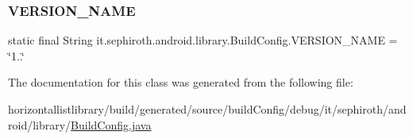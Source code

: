 \subsubsection{\texorpdfstring{V\+E\+R\+S\+I\+O\+N\+\_\+\+N\+A\+ME}{VERSION\_NAME}}
{\footnotesize\ttfamily static final String it.\+sephiroth.\+android.\+library.\+Build\+Config.\+V\+E\+R\+S\+I\+O\+N\+\_\+\+N\+A\+ME = \char`\"{}1..\char`\"{}\hspace{0.3cm}{\ttfamily [static]}}



The documentation for this class was generated from the following file\+:\begin{DoxyCompactItemize}
\item 
horizontallistlibrary/build/generated/source/build\+Config/debug/it/sephiroth/android/library/\hyperlink{horizontallistlibrary_2build_2generated_2source_2build_config_2debug_2it_2sephiroth_2android_2library_2_build_config_8java}{Build\+Config.\+java}\end{DoxyCompactItemize}
